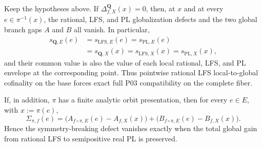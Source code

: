 \begin{corollary}
\label{cor:p031-rational-cofinality-fiber-collapse}
Keep the hypotheses above.  If
$\Delta^{\mathbf Q}_{f,X}(x)=0$, then, at $x$ and at every
$e\in\pi^{-1}(x)$, the rational, LFS, and PL globalization defects and
the two global branch gaps $A$ and $B$ all vanish.  In particular,
\begin{equation}
\label{eq:p031-rational-cofinality-fiber-collapse}
 \begin{split}
 s_{\mathbf Q,E}(e)
   &=s_{\mathrm{LFS},E}(e)
    =s_{\mathrm{PL},E}(e)\\
   &=s_{\mathbf Q,X}(x)
    =s_{\mathrm{LFS},X}(x)
    =s_{\mathrm{PL},X}(x),
 \end{split}
\end{equation}
and their common value is also the value of each local rational, LFS, and
PL envelope at the corresponding point.  Thus pointwise rational LFS local-to-global cofinality
on the base forces exact full P03 compatibility on the complete fiber.
\end{corollary}

\begin{corollary}
\label{cor:p031-orbit-rational-gap-decomposition}
If, in addition, $\pi$ has a finite analytic orbit presentation, then
for every $e\in E$, with $x:=\pi(e)$,
\begin{equation}
\label{eq:p031-orbit-rational-gap-decomposition}
 \Sigma_{\pi,f}(e)
   =\bigl(A_{f\circ\pi,E}(e)-A_{f,X}(x)\bigr)
      +\bigl(B_{f\circ\pi,E}(e)-B_{f,X}(x)\bigr).
\end{equation}
Hence the symmetry-breaking defect vanishes exactly when the total global
gain from rational LFS to semipositive real PL is preserved.
\end{corollary}
